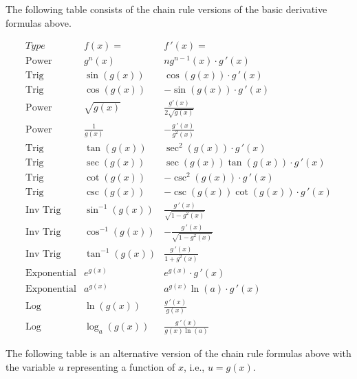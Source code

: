 \documentclass[handout]{ximera}
\begin{document}
The following table consists of the chain rule versions of the basic derivative formulas above.

\begin{center}
\[
\begin{array}{c|c|c}
		Type & f(x)= & f\,'(x)=  \\
		\hline
		\text{Power} & g^n(x) & ng^{n-1}(x)\cdot g\,'(x)  \\[8pt]
		\hline
		\text{Trig} & \sin\left(g(x)\right) & \cos\left(g(x)\right) \cdot g\,'(x) \\[8pt]
		\text{Trig} & \cos\left(g(x)\right) & -\sin\left(g(x)\right)\cdot g\,'(x)  \\[8pt]
		\hline
		\text{Power} & \sqrt{g(x)} & \displaystyle \frac{g'(x)}{2\sqrt {g(x)}}\\[8pt]
		\text{Power} & \displaystyle \frac{1}{g(x)} & -\displaystyle \frac{g\,'(x)}{g^2(x)}\\[8pt]
	  \hline
	  \text{Trig} & \tan\left(g(x)\right) & \sec^2\left(g(x)\right) \cdot g\,'(x) \\[8pt]
		\text{Trig} & \sec\left(g(x)\right) & \sec\left(g(x)\right)\tan\left(g(x)\right) \cdot g\,'(x) \\[8pt]
		\hline
		\text{Trig} & \cot\left(g(x)\right) & -\csc^2\left(g(x)\right) \cdot g\,'(x)  \\[8pt]
		\text{Trig} & \csc\left(g(x)\right) & -\csc\left(g(x)\right)\cot\left(g(x)\right) \cdot g\,'(x)  \\[8pt]
		\hline
		\text{Inv Trig} & \sin^{-1}\left(g(x)\right) &   \displaystyle \frac{g\,'(x)}{\sqrt{1-g^2(x)}}  \\[8pt]
		\text{Inv Trig} & \cos^{-1}\left(g(x)\right) &   \displaystyle -\frac{g\,'(x)}{\sqrt{1-g^2(x)}}\\[8pt]
		\text{Inv Trig} & \tan^{-1}\left(g(x)\right) &   \displaystyle \frac{g\,'(x)}{1+g^2(x)} \\[8pt]
		\hline
		\text{Exponential} & e^{g(x)} & e^{g(x)} \cdot g\,'(x) \\[8pt]
		\text{Exponential} & a^{g(x)} & a^{g(x)}\ln(a) \cdot g\,'(x) \\[8pt]
		\hline
		\text{Log} & \ln\left(g(x)\right) &   \displaystyle \frac{g\,'(x)}{g(x)} \\[8pt]
		\text{Log} & \log_a\left(g(x)\right) &   \displaystyle \frac{g\,'(x)}{g(x)\ln(a)}
	\end{array}
    \]
\end{center}


The following table is an alternative version of the chain rule formulas above 
with the variable $u$ representing a function of $x$, i.e., $u = g(x)$.
\end{document}
